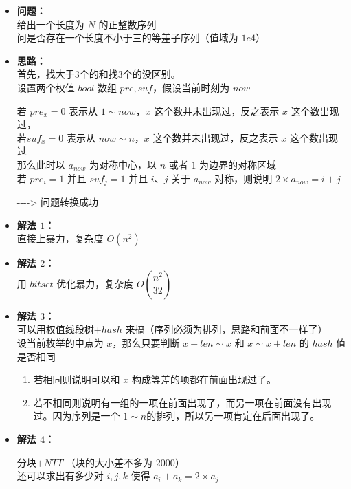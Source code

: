 \documentclass[E:/GsjzTle/main/main.tex]{subfiles}
\begin{document}
\begin{itemize}
\item
  \textbf{问题：}\\
  给出一个长度为 \(N\) 的正整数序列\\
  问是否存在一个长度不小于三的等差子序列（值域为 \(1e4\)）
\item
  \textbf{思路：}\\
  首先，找大于3个的和找3个的没区别。\\
  设置两个权值 \(bool\) 数组 \(pre,suf\)，假设当前时刻为 \(now\)

  若 \(pre_x=0\) 表示从 \(1\sim now\)，\(x\) 这个数并未出现过，反之表示
  \(x\) 这个数出现过，\\
  若\(suf_x=0\) 表示从 \(now\sim n\)，\(x\) 这个数并未出现过，反之表示
  \(x\) 这个数出现过\\
  那么此时以 \(a_{now}\) 为对称中心，以 \(n\) 或者 \(1\)
  为边界的对称区域\\
  若 \(pre_i = 1\) 并且 \(suf_j =1\) 并且 \(i\)、\(j\) 关于 \(a_{now}\)
  对称，则说明 \(2\times a_{now} = i+j\)

  -\/-\/-\/-\textgreater{} 问题转换成功
\item
  \textbf{解法 \(1\)：}\\
  直接上暴力，复杂度 \(O(n^2)\)
\item
  \textbf{解法 \(2\)：}\\
  用 \(bitset\) 优化暴力，复杂度 \(O(\dfrac{n^2}{32})\)
\item
  \textbf{解法 \(3\)：}\\
  可以用权值线段树+\(hash\) 来搞（序列必须为排列，思路和前面不一样了）\\
  设当前枚举的中点为 \(x\)，那么只要判断 \(x-len\sim x\) 和
  \(x \sim x+len\) 的 \(hash\) 值是否相同

  \begin{enumerate}
  \def\labelenumi{\arabic{enumi}.}
  \item
    若相同则说明可以和 \(x\) 构成等差的项都在前面出现过了。
  \item
    若不相同则说明有一组的一项在前面出现了，而另一项在前面没有出现过。因为序列是一个
    \(1\sim n\)的排列，所以另一项肯定在后面出现了。
  \end{enumerate}
\item
  \textbf{解法 \(4\)：}

  分块\(+ NTT\) （块的大小差不多为 \(2000\)）\\
  还可以求出有多少对 \(i,j,k\) 使得 \(a_i + a_k = 2\times a_j\)
\end{itemize}
\end{document}
